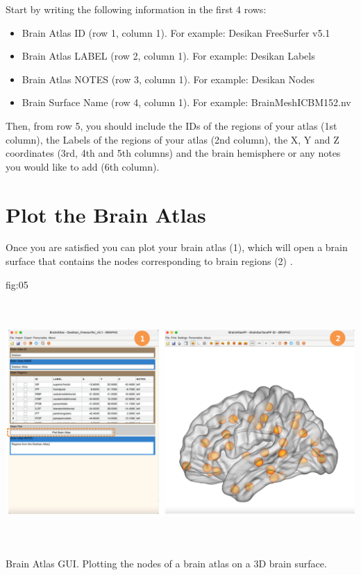 \documentclass{tufte-handout}
\begin{document}
Start by writing the following information in the first 4 rows:
\begin{itemize}

\item Brain Atlas ID (row 1, column 1). 
For example: Desikan FreeSurfer v5.1

\item Brain Atlas LABEL (row 2, column 1). 
For example: Desikan Labels

\item Brain Atlas NOTES (row 3, column 1).
For example: Desikan Nodes

\item Brain Surface Name (row 4, column 1).
For example: BrainMeshICBM152.nv

\end{itemize}
Then, from row 5, you should include the IDs of the regions of your atlas (1st column), the Labels of the regions of your atlas (2nd column), the X, Y and Z coordinates (3rd, 4th and 5th columns) and the brain hemisphere or any notes you would like to add (6th column).	

\clearpage
\section{Plot the Brain Atlas}

Once you are satisfied you can plot your brain atlas (1), which will open a brain surface that contains the nodes corresponding to brain regions (2) .

	{fig:05}
	{\includegraphics[height=10cm]{tut_ba/fig5.png}}
	{Brain Atlas GUI.}
	{
	Plotting the nodes of a brain atlas on a 3D brain surface. 
	}
	
\end{document}

